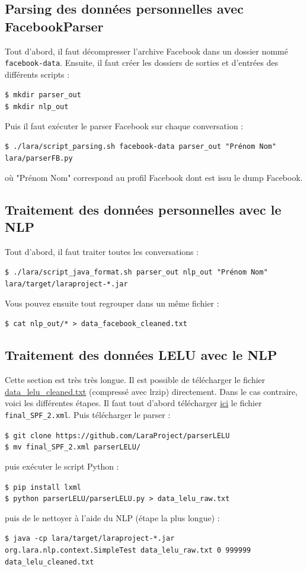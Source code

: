 \documentclass[10pt,a4paper]{article}
\begin{document}
\subsection{Parsing des données personnelles avec FacebookParser}
Tout d'abord, il faut décompresser l'archive Facebook dans un dossier nommé \texttt{facebook-data}. Ensuite, il faut créer les dossiers de sorties et d'entrées des différents scripts :
\begin{center}
	\texttt{\$ mkdir parser\_out} \\
	\texttt{\$ mkdir nlp\_out}
\end{center}
Puis il faut exécuter le parser Facebook sur chaque conversation :
\begin{center}
	\texttt{\$ ./lara/script\_parsing.sh facebook-data parser\_out "Prénom Nom" lara/parserFB.py}
\end{center}
où "Prénom Nom" correspond au profil Facebook dont est issu le dump Facebook.

\subsection{Traitement des données personnelles avec le NLP}
Tout d'abord, il faut traiter toutes les conversations :
\begin{center}
	\texttt{\$ ./lara/script\_java\_format.sh parser\_out nlp\_out "Prénom Nom" lara/target/laraproject-*.jar}
\end{center}
Vous pouvez ensuite tout regrouper dans un même fichier :
\begin{center}
	\texttt{\$ cat nlp\_out/* > data\_facebook\_cleaned.txt}
\end{center}

\subsection{Traitement des données LELU avec le NLP}
Cette section est très très longue. Il est possible de télécharger le fichier \href{https://github.com/LaraProject/notebooks/raw/master/data_lelu_cleaned.txt.lrz}{data\_lelu\_cleaned.txt} (compressé avec lrzip) directement. Dans le cas contraire, voici les différentes étapes. Il faut tout d'abord télécharger \href{https://www.kaggle.com/breandan/french-reddit-discussion}{ici} le fichier \texttt{final\_SPF\_2.xml}. Puis télécharger le parser :
\begin{center}
	\texttt{\$ git clone https://github.com/LaraProject/parserLELU} \\
	\texttt{\$ mv final\_SPF\_2.xml parserLELU/}
\end{center}
puis exécuter le script Python :
\begin{center}
	\texttt{\$ pip install lxml} \\
	\texttt{\$ python parserLELU/parserLELU.py > data\_lelu\_raw.txt}
\end{center}
puis de le nettoyer à l'aide du NLP (étape la plus longue) :
\begin{center}
	\texttt{\$ java -cp lara/target/laraproject-*.jar org.lara.nlp.context.SimpleTest data\_lelu\_raw.txt 0 999999 data\_lelu\_cleaned.txt}
\end{center}
\end{document}
